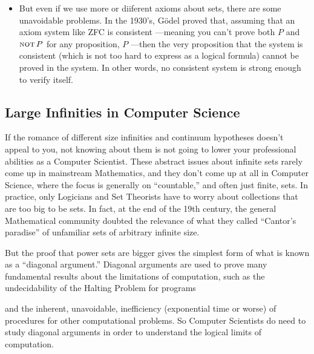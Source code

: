 \begin{itemize}
\item But even if we use more or diiferent axioms about sets, there are
  some unavoidable problems.  In the 1930's, G\"{o}del proved that,
  assuming that an axiom system like ZFC is consistent ---meaning you
  can't prove both $P$ and $\mathop{\mathrm{\textsc{not}}} P$ for any proposition, $P$ ---then the
  very proposition that the system is consistent (which is not too hard to
  express as a logical formula) cannot be proved in the system.  In other
  words, no consistent system is strong enough to verify itself.
  
\end{itemize}

\subsection{Large Infinities in Computer Science}

If the romance of different size infinities and continuum hypotheses
doesn't appeal to you, not knowing about them is not going to lower your
professional abilities as a Computer Scientist.  These abstract issues
about infinite sets rarely come up in mainstream Mathematics, and they
don't come up at all in Computer Science, where the focus is generally on
``countable,'' and often just finite, sets.  In practice, only Logicians
and Set Theorists have to worry about collections that are too big to be
sets.  In fact, at the end of the 19th century, the general Mathematical
community doubted the relevance of what they called ``Cantor's paradise''
of unfamiliar sets of arbitrary infinite size.

But the proof that power sets are bigger gives the simplest form of what
is known as a ``diagonal argument.''  Diagonal arguments are used to prove
many fundamental results about the limitations of computation, such as the
undecidability of the Halting Problem for programs
\iffalse
(a variation of which is given in
\href{http://courses.csail.mit.edu/6.042/spring09/ps2.pdf#unrecognizable.set}
{Pset 2, prob 5})
\fi
and the inherent, unavoidable, inefficiency (exponential
time or worse) of procedures for other computational problems.  So
Computer Scientists do need to study diagonal arguments in order to
understand the logical limits of computation.

\newpage
